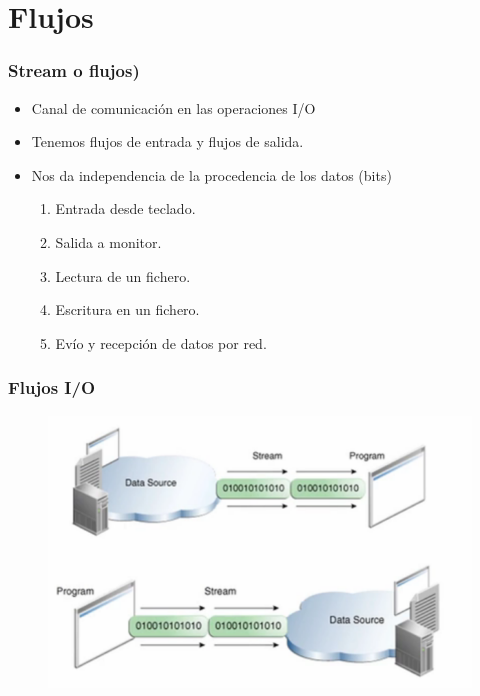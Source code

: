 \documentclass{beamer}
\begin{document}
\section{Flujos}
\begin{frame}[fragile]
\frametitle{Stream o flujos)}
\begin{itemize}[<+->]
\item Canal de comunicación en las operaciones I/O
\item Tenemos flujos de entrada y flujos de salida.
\item Nos da independencia de la procedencia de los datos (bits)
\begin{enumerate}
\item Entrada desde teclado.
\item Salida a monitor.
\item Lectura de un fichero.
\item Escritura en un fichero.
\item Evío y recepción de datos por red.
\end{enumerate}
\end{itemize}
\pause
\end{frame}

\begin{frame}
\frametitle{Flujos I/O}
\begin{figure}
\includegraphics[scale=0.5]{imagenes/flujo.png}
\end{figure}
\end{frame}
\end{document}
